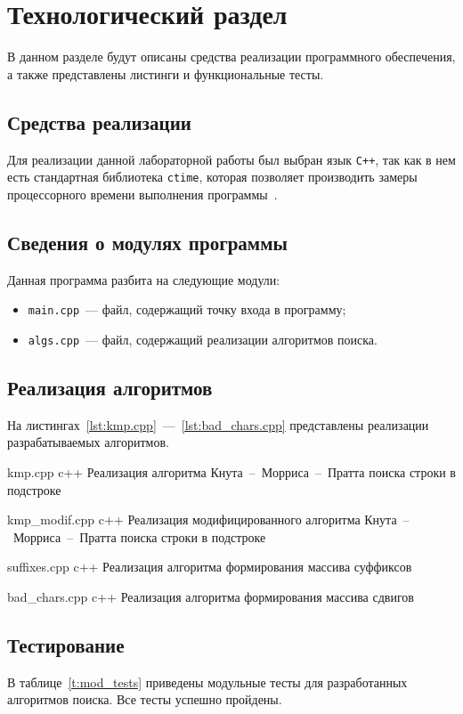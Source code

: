 \chapter{Технологический раздел}
В данном разделе будут описаны средства реализации программного обеспечения, а также представлены листинги и функциональные тесты.

\section{Средства реализации}
Для реализации данной лабораторной работы был выбран язык \texttt{C++}, так как в нем есть стандартная библиотека \texttt{ctime}, которая позволяет производить замеры процессорного времени выполнения программы~\cite{cpp-lang}. 

\section{Сведения о модулях программы}
Данная программа разбита на следующие модули:
\begin{itemize}
	\item \texttt{main.cpp}~--- файл, содержащий точку входа в программу;
	\item \texttt{algs.cpp}~--- файл, содержащий реализации алгоритмов поиска.
\end{itemize}
	
\section{Реализация алгоритмов}
На листингах~\ref{lst:kmp.cpp}~---~\ref{lst:bad_chars.cpp} представлены реализации разрабатываемых алгоритмов.

{kmp.cpp}
{c++}
{Реализация алгоритма Кнута~--~Морриса~--~Пратта поиска строки в подстроке}

{kmp_modif.cpp}
{c++}
{Реализация модифицированного алгоритма Кнута~--~Морриса~--~Пратта поиска строки в подстроке}

{suffixes.cpp}
{c++}
{Реализация алгоритма формирования массива суффиксов}

{bad_chars.cpp}
{c++}
{Реализация алгоритма формирования массива сдвигов}

\section{Тестирование}
В таблице~\ref{t:mod_tests} приведены модульные тесты для разработанных алгоритмов поиска. Все тесты успешно пройдены.

